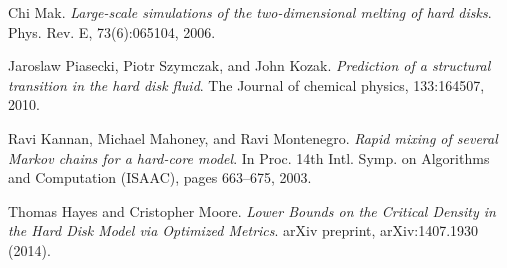 \documentclass[a4paper,11pt]{article}
\begin{document}
\begin{thebibliography}{9}


  Chi Mak. 
  \emph{Large-scale simulations of the two-dimensional melting of hard disks}.
  Phys. Rev. E,
  73(6):065104, 2006.

  Jaroslaw Piasecki, Piotr Szymczak, and John Kozak.
  \emph{Prediction of a structural transition in the hard disk fluid}.
  The Journal of chemical physics,
  133:164507, 2010.

  Ravi Kannan, Michael Mahoney, and Ravi Montenegro.
  \emph{Rapid mixing of several Markov chains for a hard-core model}.
  In Proc. 14th Intl. Symp. on Algorithms and Computation (ISAAC),
  pages 663–675, 2003.

  Thomas Hayes and Cristopher Moore.
  \emph{Lower Bounds on the Critical Density in the Hard Disk Model via Optimized Metrics}.
  arXiv preprint,
  arXiv:1407.1930 (2014).

\end{thebibliography}
\end{document}
